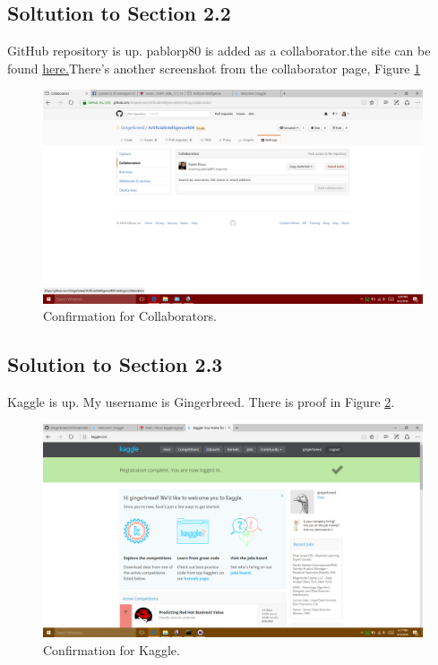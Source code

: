 \documentclass[a4paper]{article}
\begin{document}
\subsection{Soltution to Section 2.2}
GitHub repository is up. pablorp80 is added as a collaborator.the site can be found \href{http://wwwgithub.com/Gingerbreed/ArtificialIntelligence404}{here.}There's another screenshot from the collaborator page, Figure \ref{fig:CollabConfirm}

\begin{figure}
  \includegraphics[width=\linewidth]{Collaborators.png}
  \caption{Confirmation for Collaborators.}
  \label{fig:CollabConfirm}
\end{figure}	

\subsection{Solution to Section 2.3}
Kaggle is up. My username is Gingerbreed. There is proof in Figure \ref {fig:Kaggle}.


\begin{figure}
  \includegraphics[width=\linewidth]{KaggleConfirm.png}
  \caption{Confirmation for Kaggle.}
  \label{fig:Kaggle}
\end{figure}
\end{document}
